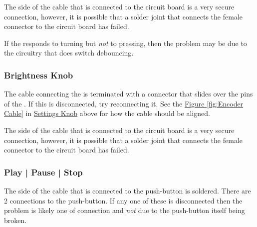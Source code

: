 \par\medskip

The side of the cable that is connected to the circuit board is a very secure
connection, however, it is possible that a solder joint that connects the
female connector to the circuit board has failed.

\par\medskip

If the  responds to turning but \textit{not} to pressing, then the
problem may be due to the circuitry that does switch debouncing.

\subsubsection{Brightness Knob}

 

\par\bigskip

The cable connecting the  is terminated with a connector that slides
over the pins of the .  If this is disconnected, try reconnecting it.
See the \hyperref[fig:Encoder Cable]{Figure \ref*{fig:Encoder Cable}}
in \hyperref[Errors - Settings Knob]{Settings Knob} above for how the
cable should be aligned.

\par\medskip

The side of the cable that is connected to the circuit board is a very secure
connection, however, it is possible that a solder joint that connects the
female connector to the circuit board has failed.

\subsubsection{Play | Pause | Stop}

 

\par\bigskip

The side of the cable that is connected to the  push-button is soldered.
There are \num{2} connections to the  push-button.  If any one of these
is disconnected then the problem is likely one of connection and \textit{not}
due to the  push-button itself being broken.


